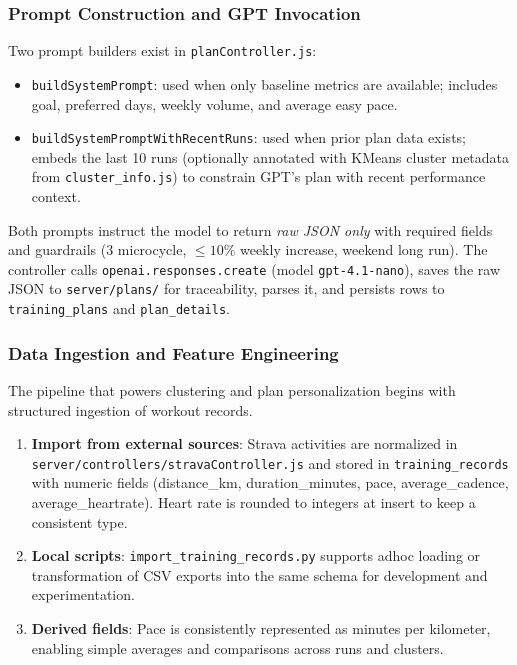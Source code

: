 \subsubsection{Prompt Construction and GPT Invocation}
Two prompt builders exist in \verb|planController.js|:
\begin{itemize}
  \item \verb|buildSystemPrompt|: used when only baseline metrics are available; includes goal, preferred days, weekly volume, and average easy pace.
  \item \verb|buildSystemPromptWithRecentRuns|: used when prior plan data exists; embeds the last 10 runs (optionally annotated with KMeans cluster metadata from \verb|cluster_info.js|) to constrain GPT's plan with recent performance context.
\end{itemize}
Both prompts instruct the model to return \emph{raw JSON only} with required fields and guardrails (3 microcycle, \(\leq 10\%\) weekly increase, weekend long run). The controller calls \verb|openai.responses.create| (model \verb|gpt-4.1-nano|), saves the raw JSON to \verb|server/plans/| for traceability, parses it, and persists rows to \verb|training_plans| and \verb|plan_details|.

\subsubsection{Data Ingestion and Feature Engineering}
The pipeline that powers clustering and plan personalization begins with structured ingestion of workout records.
\begin{enumerate}
  \item \textbf{Import from external sources}: Strava activities are normalized in \verb|server/controllers/stravaController.js| and stored in \verb|training_records| with numeric fields (distance\_km, duration\_minutes, pace, average\_cadence, average\_heartrate). Heart rate is rounded to integers at insert to keep a consistent type.
  \item \textbf{Local scripts}: \verb|import_training_records.py| supports ad\-hoc loading or transformation of CSV exports into the same schema for development and experimentation.
  \item \textbf{Derived fields}: Pace is consistently represented as minutes per kilometer, enabling simple averages and comparisons across runs and clusters.
\end{enumerate}

